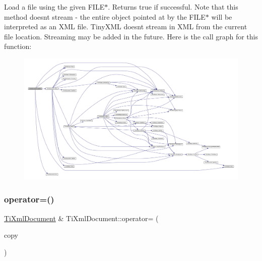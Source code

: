 Load a file using the given F\+I\+L\+E$\ast$. Returns true if successful. Note that this method doesn\textquotesingle{}t stream -\/ the entire object pointed at by the F\+I\+L\+E$\ast$ will be interpreted as an X\+ML file. Tiny\+X\+ML doesn\textquotesingle{}t stream in X\+ML from the current file location. Streaming may be added in the future. Here is the call graph for this function\+:\nopagebreak
\begin{figure}[H]
\begin{center}
\leavevmode
\includegraphics[width=350pt]{class_ti_xml_document_a41f6fe7200864d1dca663d230caf8db6_cgraph}
\end{center}
\end{figure}
\mbox{\label{class_ti_xml_document_aa56fd4dbe8917d2033d865909e2d737e}} 
\subsubsection{\texorpdfstring{operator=()}{operator=()}}
{\footnotesize\ttfamily \hyperlink{class_ti_xml_document}{Ti\+Xml\+Document} \& Ti\+Xml\+Document\+::operator= (\begin{DoxyParamCaption}\item[{const \hyperlink{class_ti_xml_document}{Ti\+Xml\+Document} \&}]{copy }\end{DoxyParamCaption})}

